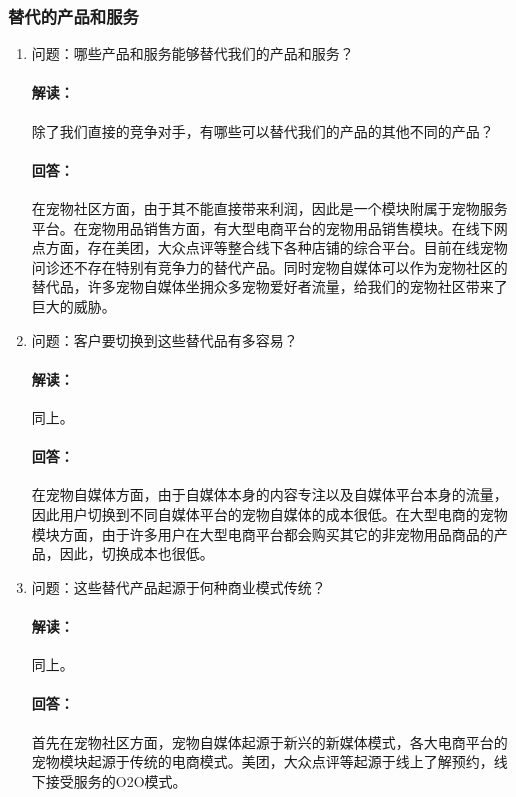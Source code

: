\documentclass[a4paper]{ctexart}
\begin{document}
\subsubsection{替代的产品和服务}
\begin{enumerate}[label=\alph*.]
  \item 问题：哪些产品和服务能够替代我们的产品和服务？
  \paragraph{解读：}除了我们直接的竞争对手，有哪些可以替代我们的产品的其他不同的产品？
  \paragraph{回答：}在宠物社区方面，由于其不能直接带来利润，因此是一个模块附属于宠物服务平台。在宠物用品销售方面，有大型电商平台的宠物用品销售模块。在线下网点方面，存在美团，大众点评等整合线下各种店铺的综合平台。目前在线宠物问诊还不存在特别有竞争力的替代产品。同时宠物自媒体可以作为宠物社区的替代品，许多宠物自媒体坐拥众多宠物爱好者流量，给我们的宠物社区带来了巨大的威胁。
  \item 问题：客户要切换到这些替代品有多容易？
  \paragraph{解读：}同上。
  \paragraph{回答：}在宠物自媒体方面，由于自媒体本身的内容专注以及自媒体平台本身的流量，因此用户切换到不同自媒体平台的宠物自媒体的成本很低。在大型电商的宠物模块方面，由于许多用户在大型电商平台都会购买其它的非宠物用品商品的产品，因此，切换成本也很低。
  \item 问题：这些替代产品起源于何种商业模式传统？
  \paragraph{解读：}同上。
  \paragraph{回答：}首先在宠物社区方面，宠物自媒体起源于新兴的新媒体模式，各大电商平台的宠物模块起源于传统的电商模式。美团，大众点评等起源于线上了解预约，线下接受服务的O2O模式。
 \end{enumerate}
\end{document}
